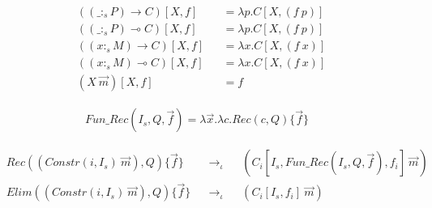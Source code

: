 \documentclass{article}
\begin{document}
\begin{align*}
  & ((\_ :_s P) \rightarrow C)[X,f] && = \lambda p.C[X,(f\ p)] \\
  & ((\_ :_s P) \multimap C)[X,f] && = \lambda p.C[X,(f\ p)] \\
  & ((x :_s M) \rightarrow C)[X,f] && = \lambda x.C[X,(f\ x)] \\
  & ((x :_s M) \multimap C)[X,f] && = \lambda x.C[X,(f\ x)] \\
  & (X\ \overrightarrow{m})[X,f] && = f
\end{align*}

\begin{align*}
  Fun\_Rec(I_s,Q,\overrightarrow{f}) = \lambda \overrightarrow{x}. \lambda c.Rec(c,Q)\{\overrightarrow{f}\}
\end{align*}

\begin{align*}
  & Rec((Constr(i, I_s)\ \overrightarrow{m}), Q)\{\overrightarrow{f}\} && \rightarrow_\iota && (C_i[I_s,Fun\_Rec(I_s,Q,\overrightarrow{f}),f_i]\ \overrightarrow{m}) \\
  & Elim((Constr(i, I_s)\ \overrightarrow{m}), Q)\{\overrightarrow{f}\} && \rightarrow_\iota && (C_i[I_s,f_i]\ \overrightarrow{m})
\end{align*}
\end{document}
